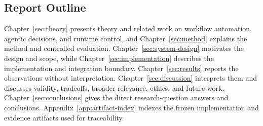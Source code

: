 \subsection{Report Outline}\label{subsec:intro-outline}

Chapter~\ref{sec:theory} presents theory and related work on workflow
automation, agentic decisions, and runtime control, and Chapter~\ref{sec:method}
explains the method and controlled evaluation. Chapter~\ref{sec:system-design}
motivates the design and scope, while Chapter~\ref{sec:implementation} describes
the implementation and integration boundary. Chapter~\ref{sec:results} reports
the observations without interpretation. Chapter~\ref{sec:discussion}
interprets them and discusses validity, tradeoffs, broader relevance, ethics,
and future work. Chapter~\ref{sec:conclusions} gives the direct research-question
answers and conclusions. Appendix~\ref{app:artifact-index} indexes the frozen
implementation and evidence artifacts used for traceability.

\setlength{\emergencystretch}{0pt}
